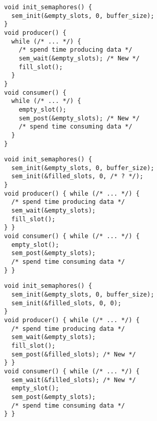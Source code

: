   \begin{slide}


    \begin{verbatim}
void init_semaphores() {
  sem_init(&empty_slots, 0, buffer_size);
}
void producer() {
  while (/* ... */) {
    /* spend time producing data */
    sem_wait(&empty_slots); /* New */
    fill_slot();
  }
}
void consumer() {
  while (/* ... */) {
    empty_slot();
    sem_post(&empty_slots); /* New */
    /* spend time consuming data */
  }
}
    \end{verbatim}


  \end{slide}

  \begin{slide}


    \begin{verbatim}
void init_semaphores() {
  sem_init(&empty_slots, 0, buffer_size);
  sem_init(&filled_slots, 0, /* ? */);
}
void producer() { while (/* ... */) {
  /* spend time producing data */
  sem_wait(&empty_slots);
  fill_slot();
} }
void consumer() { while (/* ... */) {
  empty_slot();
  sem_post(&empty_slots);
  /* spend time consuming data */
} }
    \end{verbatim}

  \end{slide}

  \begin{slide}


    \begin{verbatim}
void init_semaphores() {
  sem_init(&empty_slots, 0, buffer_size);
  sem_init(&filled_slots, 0, 0);
}
void producer() { while (/* ... */) {
  /* spend time producing data */
  sem_wait(&empty_slots);
  fill_slot();
  sem_post(&filled_slots); /* New */
} }
void consumer() { while (/* ... */) {
  sem_wait(&filled_slots); /* New */
  empty_slot();
  sem_post(&empty_slots);
  /* spend time consuming data */
} }
    \end{verbatim}

  \end{slide}

